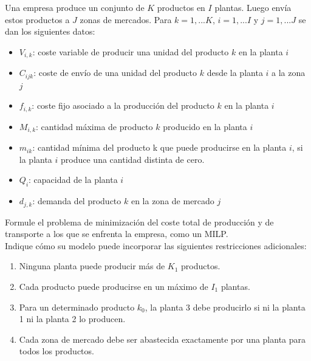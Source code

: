 Una empresa produce un conjunto de $K$ productos en $I$ plantas. Luego envía estos productos a $J$ zonas
de mercados. Para $k=1, ... K$, $i = 1, ... I$ y $j = 1, ... J$ se dan los siguientes datos:
\begin{itemize}
    \item $V_{i,k}$: coste variable de producir una unidad del producto $k$ en la planta $i$
    \item $C_{ijk}$: coste de envío de una unidad del producto $k$ desde la planta $i$ a la zona $j$
    \item $f_{i,k}$: coste fijo asociado a la producción del producto $k$ en la planta $i$
    \item $M_{i,k}$: cantidad máxima de producto $k$ producido en la planta $i$
    \item $m_{ik}$: cantidad mínima del producto k que puede producirse en la planta $i$, si la planta $i$ produce una cantidad distinta de cero.
    \item $Q_i$: capacidad de la planta $i$
    \item $d_{j,k}$: demanda del producto $k$ en la zona de mercado $j$
\end{itemize}

Formule el problema de minimización del coste total de producción y de transporte a los que se enfrenta la empresa, como un MILP.\\
Indique cómo su modelo puede incorporar las siguientes restricciones adicionales:
\begin{enumerate}
    \item Ninguna planta puede producir más de $K_1$ productos.
    \item Cada producto puede producirse en un máximo de $I_1$ plantas.
    \item Para un determinado producto $k_0$, la planta 3 debe producirlo si ni la planta 1 ni la planta 2 lo producen.
    \item Cada zona de mercado debe ser abastecida exactamente por una planta para todos los productos.
\end{enumerate}
